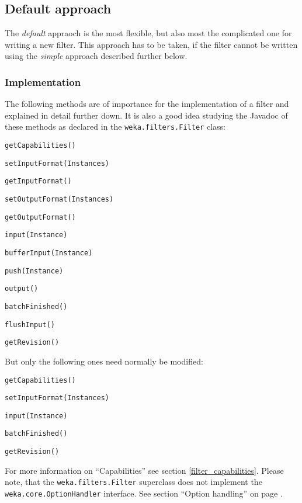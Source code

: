 \subsection{Default approach}
The \textit{default} appraoch is the most flexible, but also most the
complicated one for writing a new filter. This approach has to be taken, if the
filter cannot be
written using the \textit{simple} approach described further below.

\subsubsection{Implementation}
The following methods are of importance for the implementation of a filter and
explained in detail further down. It is also a good idea studying the Javadoc
of these methods as declared in the \texttt{weka.filters.Filter} class:
\begin{tight_itemize}
  \item \texttt{getCapabilities()}
  \item \texttt{setInputFormat(Instances)}
  \item \texttt{getInputFormat()}
  \item \texttt{setOutputFormat(Instances)}
  \item \texttt{getOutputFormat()}
  \item \texttt{input(Instance)}
  \item \texttt{bufferInput(Instance)}
  \item \texttt{push(Instance)}
  \item \texttt{output()}
  \item \texttt{batchFinished()}
  \item \texttt{flushInput()}
  \item \texttt{getRevision()}
\end{tight_itemize}
But only the following ones need normally be modified:
\begin{tight_itemize}
  \item \texttt{getCapabilities()}
  \item \texttt{setInputFormat(Instances)}
  \item \texttt{input(Instance)}
  \item \texttt{batchFinished()}
  \item \texttt{getRevision()}
\end{tight_itemize}
For more information on ``Capabilities'' see section \ref{filter_capabilities}.
Please note, that the \texttt{weka.filters.Filter} superclass does not
implement the \texttt{weka.core.OptionHandler} interface. See section ``Option
handling'' on page \pageref{filter_optionhandling}.

